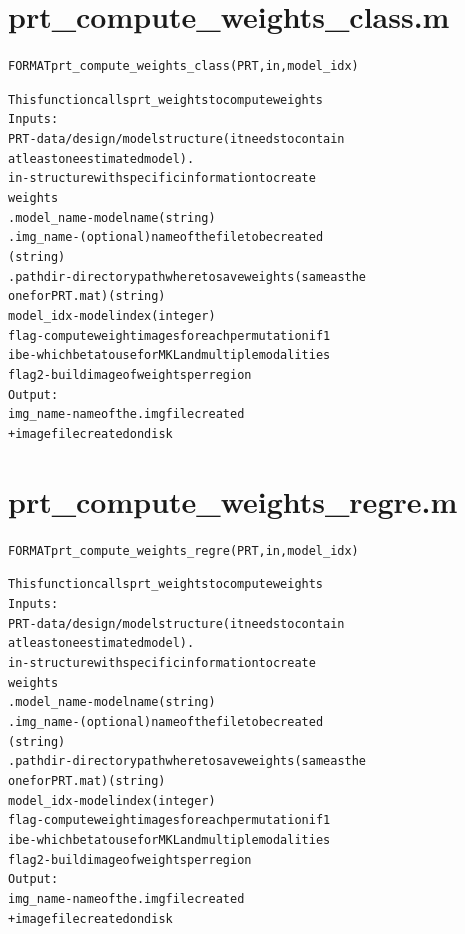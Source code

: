 \section{prt\_compute\_weights\_class.m}
\begin{alltt}

 FORMAT prt\_compute\_weights\_class(PRT,in,model\_idx)
 
 This function calls prt\_weights to compute weights
 Inputs:
       PRT             - data/design/model structure (it needs to contain
                         at least one estimated model).
         in            - structure with specific information to create
                         weights
           .model\_name - model name (string)
           .img\_name   - (optional) name of the file to be created
                         (string)
           .pathdir    - directory path where to save weights (same as the
                         one for PRT.mat) (string)
         model\_idx     - model index (integer)
         flag          - compute weight images for each permutation if 1
         ibe           - which beta to use for MKL and multiple modalities
         flag2         - build image of weights per region
 Output:
       img\_name        - name of the .img file created
       + image file created on disk
\end{alltt}


\section{prt\_compute\_weights\_regre.m}
\begin{alltt}

 FORMAT prt\_compute\_weights\_regre(PRT,in,model\_idx)
 
 This function calls prt\_weights to compute weights
 Inputs:
       PRT             - data/design/model structure (it needs to contain
                         at least one estimated model).
         in            - structure with specific information to create
                         weights
           .model\_name - model name (string)
           .img\_name   - (optional) name of the file to be created
                         (string)
           .pathdir    - directory path where to save weights (same as the
                         one for PRT.mat) (string)
         model\_idx     - model index (integer)
         flag          - compute weight images for each permutation if 1
         ibe           - which beta to use for MKL and multiple modalities
         flag2         - build image of weights per region
 Output:
       img\_name        - name of the .img file created
       + image file created on disk
\end{alltt}


